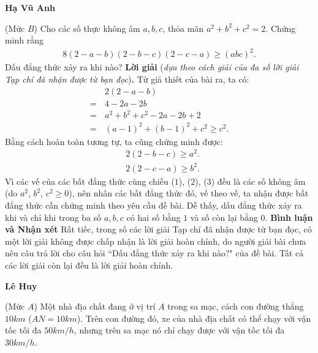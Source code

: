 \begin{multicols}{2}
	\begin{flushright}
		\textbf{Hạ Vũ Anh}
	\end{flushright}
	{}
	(Mức $B$) Cho các số thực không âm $a, b, c$, thỏa mãn $a^2 + b^2 + c^2 =2$.  Chứng minh rằng
	\begin{align*}
		8\left( {2 \!-\! a \!-\! b} \right)\left( {2 \!-\! b \!-\! c} \right)\left( {2 \!-\! c \!-\! a} \right) \ge {\left( {abc} \right)^2}.
	\end{align*}
	Dấu đẳng thức xảy ra khi nào?
	\vskip 0.05cm
	\textbf{Lời giải} (\textit{dựa theo cách giải của đa số lời giải Tạp chí đã nhận được từ bạn đọc})\textbf{.}
	\vskip 0.05cm
	Từ giả thiết của bài ra, ta có:
	\begin{align*}
		&2\left( {2 - a - b} \right) \\
		= \,&4 - 2a - 2b \\
		= \,&{a^2} + {b^2} + {c^2} - 2a - 2b + 2 \\
		= \,&{\left( {a - 1} \right)^2} + {\left( {b - 1} \right)^2} + {c^2} \ge {c^2}. \tag{$1$}
	\end{align*}
	Bằng cách hoàn toàn tương tự, ta cũng chứng minh được:
	\begin{align*}
		&2\left( {2 - b - c} \right) \ge {a^2}.\tag{$2$}\\
		&2\left( {2 - c - a} \right) \ge {b^2}.\tag{$3$}
	\end{align*}
	Vì các vế của các bất đẳng thức cùng chiều ($1$), ($2$), ($3$) đều là các số không âm (do  $a^2$, $b^2$, $c^2 \ge 0$), nên nhân các bất đẳng thức đó, vế theo vế, ta nhận được bất đẳng thức cần chứng minh theo yêu cầu đề bài.
	\vskip 0.05cm
	Dễ thấy, dấu đẳng thức xảy ra khi và chỉ khi trong ba số $a, b, c$ có hai số bằng $1$ và số còn lại bằng $0$.
	\vskip 0.05cm
	\textbf{Bình luận và Nhận xét}
	\vskip 0.05cm
	Rất tiếc, trong số các lời giải Tạp chí đã nhận được từ bạn đọc, có một lời giải không được chấp nhận là lời giải hoàn chỉnh, do người giải bài chưa nêu câu trả lời cho câu hỏi ``Dấu đẳng thức xảy ra khi nào?" của đề bài. Tất cả các lời giải còn lại đều là lời giải hoàn chỉnh.
	\begin{flushright}
		\textbf{Lê Huy}
	\end{flushright}
	{}
	(Mức $A$) Một nhà địa chất đang ở vị trí $A$ trong sa mạc, cách con đường thẳng $10km$ ($AN = 10km$). Trên con đường đó, xe của nhà địa chất có thể chạy với vận tốc tối đa $50km/h$, nhưng trên sa mạc nó chỉ chạy được với vận tốc tối đa $30km/h$.

\end{multicols}
